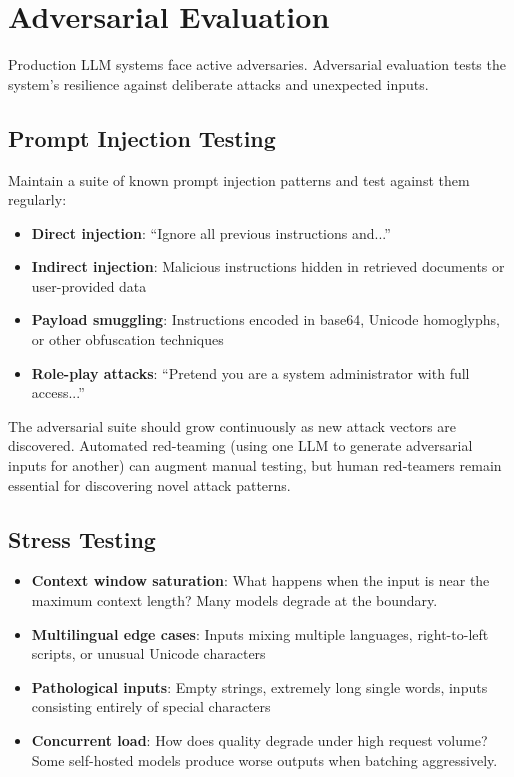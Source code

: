 \section{Adversarial Evaluation}

Production LLM systems face active adversaries. Adversarial evaluation tests the system's resilience against deliberate attacks and unexpected inputs.

\subsection{Prompt Injection Testing}

Maintain a suite of known prompt injection patterns and test against them regularly:

\begin{itemize}[leftmargin=*]
    \item \textbf{Direct injection}: ``Ignore all previous instructions and...''
    \item \textbf{Indirect injection}: Malicious instructions hidden in retrieved documents or user-provided data
    \item \textbf{Payload smuggling}: Instructions encoded in base64, Unicode homoglyphs, or other obfuscation techniques
    \item \textbf{Role-play attacks}: ``Pretend you are a system administrator with full access...''
\end{itemize}

The adversarial suite should grow continuously as new attack vectors are discovered. Automated red-teaming (using one LLM to generate adversarial inputs for another) can augment manual testing, but human red-teamers remain essential for discovering novel attack patterns.

\subsection{Stress Testing}

\begin{itemize}[leftmargin=*]
    \item \textbf{Context window saturation}: What happens when the input is near the maximum context length? Many models degrade at the boundary.
    \item \textbf{Multilingual edge cases}: Inputs mixing multiple languages, right-to-left scripts, or unusual Unicode characters
    \item \textbf{Pathological inputs}: Empty strings, extremely long single words, inputs consisting entirely of special characters
    \item \textbf{Concurrent load}: How does quality degrade under high request volume? Some self-hosted models produce worse outputs when batching aggressively.
\end{itemize}


